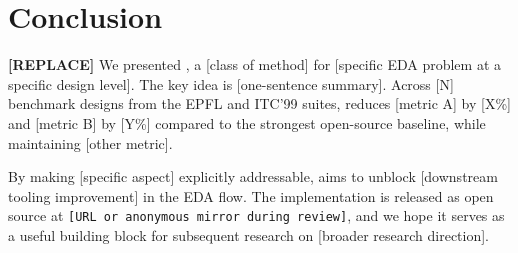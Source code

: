 \section{Conclusion}
\label{sec:conclusion}


\textbf{[REPLACE]} We presented \method{}, a [class of method] for
[specific EDA problem at a specific design level]. The key idea is
[one-sentence summary]. Across [N] benchmark designs from the EPFL and
ITC'99 suites, \method{} reduces [metric A] by [X\%] and [metric B] by
[Y\%] compared to the strongest open-source baseline, while maintaining
[other metric].

By making [specific aspect] explicitly addressable, \method{} aims to
unblock [downstream tooling improvement] in the EDA flow. The implementation
is released as open source at
\texttt{[URL or anonymous mirror during review]}, and we hope it serves
as a useful building block for subsequent research on
[broader research direction].
